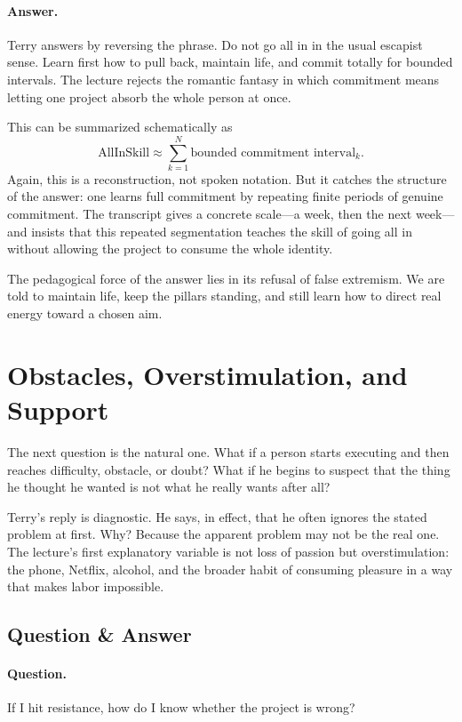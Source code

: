 \paragraph{Answer.} Terry answers by reversing the phrase. Do not go all in in the usual escapist sense. Learn first how to pull back, maintain life, and commit totally for bounded intervals. The lecture rejects the romantic fantasy in which commitment means letting one project absorb the whole person at once.

This can be summarized schematically as
\begin{equation}
\text{AllInSkill} \approx \sum_{k=1}^{N} \text{bounded commitment interval}_k.
\end{equation}
Again, this is a reconstruction, not spoken notation. But it catches the structure of the answer: one learns full commitment by repeating finite periods of genuine commitment. The transcript gives a concrete scale---a week, then the next week---and insists that this repeated segmentation teaches the skill of going all in without allowing the project to consume the whole identity.

The pedagogical force of the answer lies in its refusal of false extremism. We are told to maintain life, keep the pillars standing, and still learn how to direct real energy toward a chosen aim.

\section{Obstacles, Overstimulation, and Support}

The next question is the natural one. What if a person starts executing and then reaches difficulty, obstacle, or doubt? What if he begins to suspect that the thing he thought he wanted is not what he really wants after all?

Terry's reply is diagnostic. He says, in effect, that he often ignores the stated problem at first. Why? Because the apparent problem may not be the real one. The lecture's first explanatory variable is not loss of passion but overstimulation: the phone, Netflix, alcohol, and the broader habit of consuming pleasure in a way that makes labor impossible.

\subsection{Question \& Answer}

\paragraph{Question.} If I hit resistance, how do I know whether the project is wrong?

